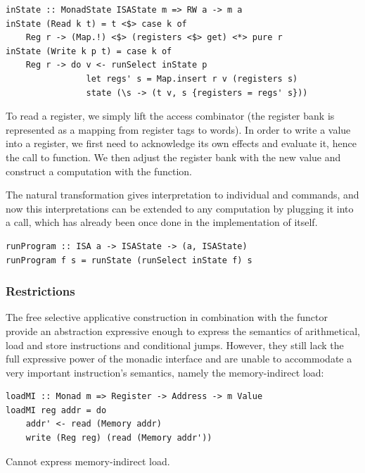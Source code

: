 \begin{verbatim}
inState :: MonadState ISAState m => RW a -> m a
inState (Read k t) = t <$> case k of
    Reg r -> (Map.!) <$> (registers <$> get) <*> pure r
inState (Write k p t) = case k of
    Reg r -> do v <- runSelect inState p
                let regs' s = Map.insert r v (registers s)
                state (\s -> (t v, s {registers = regs' s}))
\end{verbatim}

To read a register, we simply lift the  access combinator (the register bank
is represented as a mapping from register tags to words). In order to write a value into a
register, we first need to acknowledge its own effects and evaluate it, hence the call to
 function. We then adjust the register bank with the new value and construct
a  computation with the  function.

The  natural transformation gives interpretation to individual  and
 commands, and now this interpretations can be extended to any 
computation by plugging it into a  call, which has already been once done in
the implementation of  itself.

\begin{verbatim}
runProgram :: ISA a -> ISAState -> (a, ISAState)
runProgram f s = runState (runSelect inState f) s
\end{verbatim}

\subsubsection{\textbf{Restrictions}}

The free selective applicative construction in combination with the  functor
provide an abstraction expressive enough to express the
semantics of arithmetical, load and store instructions and conditional jumps. However,
they still lack the full expressive power of the monadic interface and are unable
to accommodate a very important instruction's semantics, namely the memory-indirect load:

\begin{verbatim}
loadMI :: Monad m => Register -> Address -> m Value
loadMI reg addr = do
    addr' <- read (Memory addr)
    write (Reg reg) (read (Memory addr'))
\end{verbatim}

Cannot express memory-indirect load.